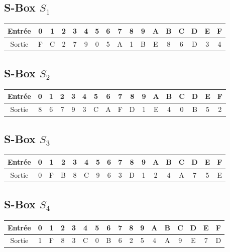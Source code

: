 \documentclass[12pt,a4paper]{report}
\begin{document}
\subsection*{S-Box $S_1$}
\begin{center}
\begin{tabular}{|c|cccccccccccccccc|}
\hline
Entrée & 0 & 1 & 2 & 3 & 4 & 5 & 6 & 7 & 8 & 9 & A & B & C & D & E & F \\
\hline
Sortie & F & C & 2 & 7 & 9 & 0 & 5 & A & 1 & B & E & 8 & 6 & D & 3 & 4 \\
\hline
\end{tabular}
\end{center}

\subsection*{S-Box $S_2$}
\begin{center}
\begin{tabular}{|c|cccccccccccccccc|}
\hline
Entrée & 0 & 1 & 2 & 3 & 4 & 5 & 6 & 7 & 8 & 9 & A & B & C & D & E & F \\
\hline
Sortie & 8 & 6 & 7 & 9 & 3 & C & A & F & D & 1 & E & 4 & 0 & B & 5 & 2 \\
\hline
\end{tabular}
\end{center}

\subsection*{S-Box $S_3$}
\begin{center}
\begin{tabular}{|c|cccccccccccccccc|}
\hline
Entrée & 0 & 1 & 2 & 3 & 4 & 5 & 6 & 7 & 8 & 9 & A & B & C & D & E & F \\
\hline
Sortie & 0 & F & B & 8 & C & 9 & 6 & 3 & D & 1 & 2 & 4 & A & 7 & 5 & E \\
\hline
\end{tabular}
\end{center}

\subsection*{S-Box $S_4$}
\begin{center}
\begin{tabular}{|c|cccccccccccccccc|}
\hline
Entrée & 0 & 1 & 2 & 3 & 4 & 5 & 6 & 7 & 8 & 9 & A & B & C & D & E & F \\
\hline
Sortie & 1 & F & 8 & 3 & C & 0 & B & 6 & 2 & 5 & 4 & A & 9 & E & 7 & D \\
\hline
\end{tabular}
\end{center}
\end{document}
